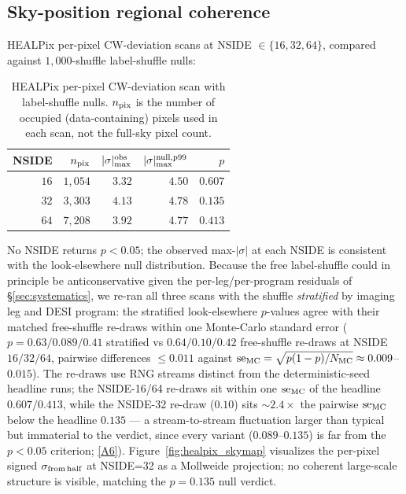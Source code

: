 \documentclass[aps,prd,twocolumn,superscriptaddress,showpacs,preprintnumbers,nofootinbib,longbibliography,floatfix]{revtex4-2}
\newcommand{\repoBase}{https://github.com/Hubify-Projects/bigbounce/blob/main}
\begin{document}
\subsection{Sky-position regional coherence}\label{sec:results_healpix}

HEALPix per-pixel CW-deviation scans at NSIDE $\in \{16, 32, 64\}$,
compared against $1{,}000$-shuffle label-shuffle nulls:

\begin{table}[ht]
\caption{HEALPix per-pixel CW-deviation scan with label-shuffle nulls.
$n_{\rm pix}$ is the number of occupied (data-containing) pixels used
in each scan, not the full-sky pixel count.}
\label{tab:healpix}
\begin{ruledtabular}
\begin{tabular}{rrrrr}
NSIDE & $n_{\rm pix}$ & $|\sigma|^{\rm obs}_{\max}$ &
$|\sigma|^{\rm null,p99}_{\max}$ & $p$ \\
\hline
$16$ & $1{,}054$ & $3.32$ & $4.50$ & $0.607$ \\
$32$ & $3{,}303$ & $4.13$ & $4.78$ & $0.135$ \\
$64$ & $7{,}208$ & $3.92$ & $4.77$ & $0.413$ \\
\end{tabular}
\end{ruledtabular}
\end{table}

No NSIDE returns $p<0.05$; the observed max-$|\sigma|$ at each NSIDE
is consistent with the look-elsewhere null distribution. Because the
free label-shuffle could in principle be anticonservative given the
per-leg/per-program residuals of \S\ref{sec:systematics}, we re-ran
all three scans with the shuffle \emph{stratified} by imaging leg and
DESI program: the stratified look-elsewhere $p$-values agree with
their matched free-shuffle re-draws within one Monte-Carlo standard
error ($p = 0.63 / 0.089 / 0.41$ stratified vs
$0.64 / 0.10 / 0.42$ free-shuffle re-draws at NSIDE $16/32/64$,
pairwise differences $\leq 0.011$ against
${\rm se}_{\rm MC} = \sqrt{p(1-p)/N_{\rm MC}} \approx 0.009$--$0.015$).
The re-draws use RNG streams distinct from the deterministic-seed
headline runs; the NSIDE-16/64 re-draws sit within one
${\rm se}_{\rm MC}$ of the headline $0.607/0.413$, while the NSIDE-32
re-draw ($0.10$) sits ${\sim}2.4\times$ the pairwise
${\rm se}_{\rm MC}$ below the headline $0.135$ --- a stream-to-stream
fluctuation larger than typical but immaterial to the verdict, since
every variant ($0.089$--$0.135$) is far from the $p<0.05$ criterion;
\href{\repoBase/pipelines/p5\_desi\_chirality/outputs/18\_v0151\_stratified\_and\_density.json}{[A6]}).
Figure~\ref{fig:healpix_skymap} visualizes the per-pixel signed
$\sigma_{\rm from\,half}$ at NSIDE=32 as a Mollweide projection; no
coherent large-scale structure is visible, matching the $p\!=\!0.135$
null verdict.
\end{document}
